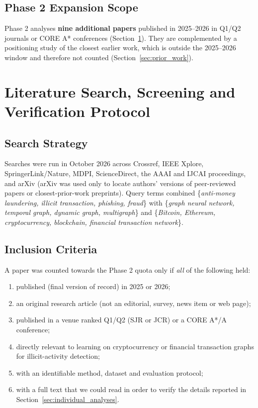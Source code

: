 \documentclass[11pt,a4paper]{article}
\begin{document}
\subsection{Phase 2 Expansion Scope}
Phase 2 analyses \textbf{nine additional papers} published in 2025--2026 in Q1/Q2 journals or CORE A* conferences (Section~\ref{sec:selection}). They are complemented by a positioning study of the closest earlier work, which is outside the 2025--2026 window and therefore not counted (Section~\ref{sec:prior_work}).

\section{Literature Search, Screening and Verification Protocol}
\label{sec:selection}

\subsection{Search Strategy}
Searches were run in October 2026 across Crossref, IEEE Xplore, SpringerLink/Nature, MDPI, ScienceDirect, the AAAI and IJCAI proceedings, and arXiv (arXiv was used only to locate authors' versions of peer-reviewed papers or closest-prior-work preprints). Query terms combined \{\textit{anti-money laundering, illicit transaction, phishing, fraud}\} with \{\textit{graph neural network, temporal graph, dynamic graph, multigraph}\} and \{\textit{Bitcoin, Ethereum, cryptocurrency, blockchain, financial transaction network}\}.

\subsection{Inclusion Criteria}
A paper was counted towards the Phase 2 quota only if \emph{all} of the following held:
\begin{enumerate}[leftmargin=*]
    \item published (final version of record) in 2025 or 2026;
    \item an original research article (not an editorial, survey, news item or web page);
    \item published in a venue ranked Q1/Q2 (SJR or JCR) or a CORE A*/A conference;
    \item directly relevant to learning on cryptocurrency or financial transaction graphs for illicit-activity detection;
    \item with an identifiable method, dataset and evaluation protocol;
    \item with a full text that we could read in order to verify the details reported in Section~\ref{sec:individual_analyses}.
\end{enumerate}
\end{document}
